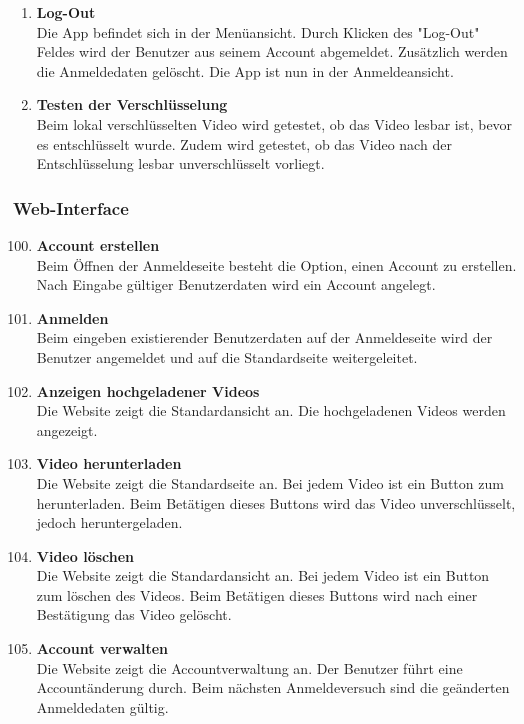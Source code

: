 \begin{enumerate}[\bfseries{T}10]
\item \textbf{Log-Out} \hfill\\
Die \gls{App} befindet sich in der Men\"uansicht. Durch Klicken des "Log-Out" Feldes wird der Benutzer aus seinem Account abgemeldet. Zus\"atzlich werden die Anmeldedaten gel\"oscht. Die \gls{App} ist nun in der Anmeldeansicht.

\item \textbf{Testen der Verschl\"usselung} \hfill\\
Beim lokal verschl\"usselten Video wird getestet, ob das Video lesbar ist, bevor es entschl\"usselt wurde. Zudem wird getestet, ob das Video nach der Entschl\"usselung lesbar unverschl\"usselt vorliegt.
\end{enumerate}

\subsubsection{\gls{Web-Interface}}
\begin{enumerate}[\bfseries{T}10]  
\setcounter{enumi}{99}{}
\item \textbf{Account erstellen} \hfill\\
Beim \"Offnen der Anmeldeseite besteht die Option, einen Account zu erstellen. Nach Eingabe g\"ultiger Benutzerdaten wird ein Account angelegt.

\item \textbf{Anmelden} \hfill\\
Beim eingeben existierender Benutzerdaten auf der Anmeldeseite wird der Benutzer angemeldet und auf die Standardseite weitergeleitet.

\item \textbf{Anzeigen hochgeladener Videos} \hfill\\
Die Website zeigt die Standardansicht an. Die hochgeladenen Videos werden angezeigt. 

\item \textbf{Video herunterladen} \hfill\\
Die Website zeigt die Standardseite an. Bei jedem Video ist ein Button zum herunterladen. Beim Bet\"atigen dieses Buttons wird das Video unverschl\"usselt, jedoch  heruntergeladen.

\item \textbf{Video l\"oschen} \hfill\\
Die Website zeigt die Standardansicht an. Bei jedem Video ist ein Button zum l\"oschen des Videos. Beim Bet\"atigen dieses Buttons wird nach einer Best\"atigung das Video gel\"oscht.

\item \textbf{Account verwalten} \hfill\\
Die Website zeigt die Accountverwaltung an. Der Benutzer f\"uhrt eine Account\"anderung durch. Beim n\"achsten Anmeldeversuch sind die ge\"anderten Anmeldedaten g\"ultig.
\end{enumerate}

